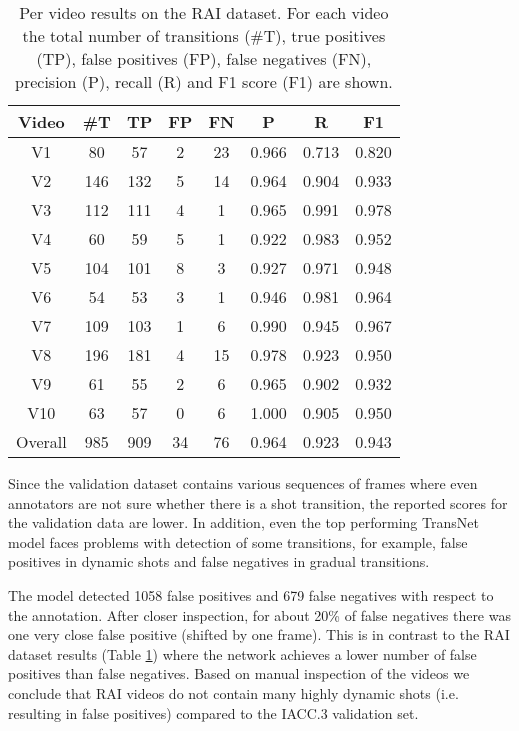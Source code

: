 \begin{table}[b]
    \centering
    \begin{tabular}{|c|c|c|c|c|c|c|c|}
        \hline
        \textbf{Video} & \textbf{\#T}   & \textbf{TP}    & \textbf{FP}    & \textbf{FN}    & \textbf{P}     & \textbf{R}     & \textbf{F1}   \\
        \hline
        V1       &    80 &    57 &     2 &    23 & 0.966 & 0.713 & 0.820\\
        V2       &   146 &   132 &     5 &    14 & 0.964 & 0.904 & 0.933\\
        V3       &   112 &   111 &     4 &     1 & 0.965 & 0.991 & 0.978\\
        V4       &    60 &    59 &     5 &     1 & 0.922 & 0.983 & 0.952\\
        V5       &   104 &   101 &     8 &     3 & 0.927 & 0.971 & 0.948\\
        V6       &    54 &    53 &     3 &     1 & 0.946 & 0.981 & 0.964\\
        V7       &   109 &   103 &     1 &     6 & 0.990 & 0.945 & 0.967\\
        V8       &   196 &   181 &     4 &    15 & 0.978 & 0.923 & 0.950\\
        V9       &    61 &    55 &     2 &     6 & 0.965 & 0.902 & 0.932\\
        V10      &    63 &    57 &     0 &     6 & 1.000 & 0.905 & 0.950\\
        \hline
        Overall  &   985 &   909 &    34 &    76 & 0.964 & 0.923 & 0.943\\
        \hline
    \end{tabular}
    
    \caption{Per video results on the RAI dataset. \textmd{For each video the total number of transitions (\#T), true positives (TP), false positives (FP), false negatives (FN), precision (P), recall (R) and F1 score (F1) are shown.}}
    \label{tab:resultsRAI}
\end{table}

Since the validation dataset contains various sequences of frames where even annotators are not sure whether there is a shot transition, the reported scores for the validation data are lower. In addition, even the top performing TransNet model faces problems with detection of some transitions, for example, false positives in dynamic shots and false negatives in gradual transitions.

The model detected 1058 false positives and 679 false negatives with respect to the annotation. After closer inspection, for about 20\% of false negatives there was one very close false positive (shifted by one frame). This is in contrast to the RAI dataset results (Table \ref{tab:resultsRAI}) where the network achieves a lower number of false positives than false negatives. Based on manual inspection of the videos we conclude that RAI videos do not contain many highly dynamic shots (i.e. resulting in false positives) compared to the IACC.3 validation set.

